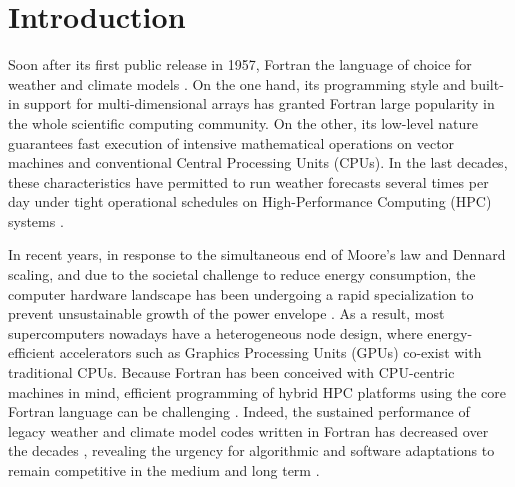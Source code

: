 \documentclass[main.tex]{subfiles}
\begin{document}
	\justifying

	\section{Introduction}
    \label{section:introduction}

        Soon after its first public release in 1957, Fortran  the language of choice for weather and climate models \citep{mendez14}. On the one hand, its  programming style and built-in support for multi-dimensional arrays has granted Fortran large popularity in the whole scientific computing community. On the other, its low-level nature guarantees fast execution of intensive mathematical operations on vector machines and conventional Central Processing Units (CPUs). In the last decades, these characteristics have permitted to run weather forecasts several times per day under tight operational schedules on High-Performance Computing (HPC) systems \citep{neumann19}.

        In recent years, in response to the simultaneous end of Moore's law and Dennard scaling, and due to the societal challenge to reduce energy consumption, the computer hardware landscape has been undergoing a rapid specialization to prevent unsustainable growth of the power envelope \citep{muller19}. As a result, most supercomputers nowadays have a heterogeneous node design, where energy-efficient accelerators such as Graphics Processing Units (GPUs) co-exist with traditional CPUs. Because Fortran has been conceived with CPU-centric machines in mind, efficient programming of hybrid HPC platforms using the core Fortran language can be challenging \citep{mendez14, lawrence18}. Indeed, the sustained performance of legacy weather and climate model codes written in Fortran has decreased over the decades \citep{schulthess18}, revealing the urgency for algorithmic and software adaptations to remain competitive in the medium and long term \citep{bauer21}.
\end{document}
